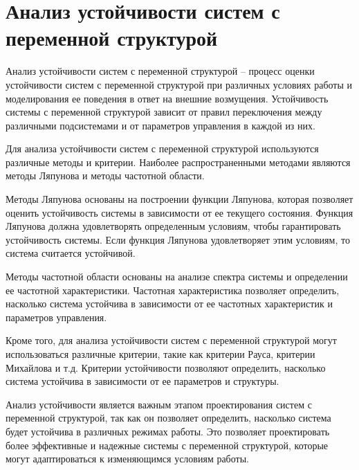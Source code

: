 \section{Анализ устойчивости систем с переменной структурой} 


Анализ устойчивости систем с переменной структурой -- процесс оценки устойчивости систем с переменной структурой при различных условиях работы и моделирования ее поведения в ответ на внешние возмущения. Устойчивость системы с переменной структурой зависит от правил переключения между различными подсистемами и от параметров управления в каждой из них.

Для анализа устойчивости систем с переменной структурой используются различные методы и критерии. Наиболее распространенными методами являются методы Ляпунова и методы частотной области.

Методы Ляпунова основаны на построении функции Ляпунова, которая позволяет оценить устойчивость системы в зависимости от ее текущего состояния. Функция Ляпунова должна удовлетворять определенным условиям, чтобы гарантировать устойчивость системы. Если функция Ляпунова удовлетворяет этим условиям, то система считается устойчивой.

Методы частотной области основаны на анализе спектра системы и определении ее частотной характеристики. Частотная характеристика позволяет определить, насколько система устойчива в зависимости от ее частотных характеристик и параметров управления.

Кроме того, для анализа устойчивости систем с переменной структурой могут использоваться различные критерии, такие как критерии Рауса, критерии Михайлова и т.д. Критерии устойчивости позволяют определить, насколько система устойчива в зависимости от ее параметров и структуры.

Анализ устойчивости является важным этапом проектирования систем с переменной структурой, так как он позволяет определить, насколько система будет устойчива в различных режимах работы. Это позволяет проектировать более эффективные и надежные системы с переменной структурой, которые могут адаптироваться к изменяющимся условиям работы.
  